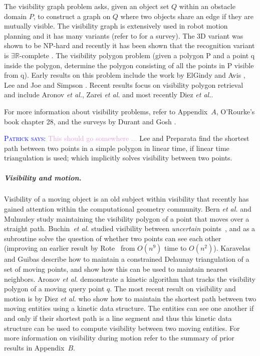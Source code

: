 \documentclass[a4paper, UKenglish]{lipics-v2018}
\newcommand{\myremark}[4]{\textcolor{blue}{\textsc{#1 #2:}} \textcolor{#4}{\textsf{#3}}}
\newcommand{\patrick}[2][says]{\myremark{Patrick}{#1}{#2}{Plum}}
\newcommand{\etal}{\textit{et al.}\xspace}
\begin{document}
The visibility graph problem asks, given an object set $Q$ within an obstacle domain $P$, to construct a graph on $Q$ where two objects share an edge if they are mutually visible. The visibility graph is extensively used in robot motion planning \cite{de1997computational} and it has many variants (refer to \cite{Ghosh:2013:UPV:2543581.2543589} for a survey). The 3D variant was shown to be NP-hard \cite{canny1988complexity} and recently it has been shown that the recognition variant is $\exists \mathbb{R}$-complete \cite{cardinal2017recognition}. The visibility polygon problem (given a polygon P and a point q inside the polygon, determine the polygon consisting of all the points in P visible from q). Early results on this problem include the work by ElGindy and Avis \cite{el1981linear}, Lee \cite{lee1983visibility} and Joe and Simpson \cite{joe1987corrections}. Recent results focus on visibility polygon retrieval and include Aronov \etal \cite{aronov2002visibility}, Zarei \etal \cite{zarei2005efficient} and most recently Diez \etal \cite{DKRRS2017KineticAPSPEuroCG}.

For more information about visibility problems, refer to Appendix~$A$, O'Rourke's book \cite{ORourke87} chapter 28, and the surveys by Durant \cite{durand2000multidisciplinary} and Gosh  \cite{Ghosh:2013:UPV:2543581.2543589}. 

\patrick{This should go somewhere ...} Lee and Preparata \cite{LeeP84} find the shortest path between two points in a simple polygon in linear time, if linear time triangulation is used; which implicitly solves visibility between two points.

\subparagraph{Visibility and motion.}

Visibility of a moving object is an old subject within visibility that recently has gained attention within the computational geometry community. Bern \etal \cite{bern1994visibility} and  Mulmuley \cite{mulmuley1991hidden} study maintaining the visibility polygon of a point that moves over a straight path. 
Buchin~\etal studied visibility between {\em uncertain} points~\cite {bkls-rbavil-19}, and as a subroutine solve the question of whether two points can see each other (improving an earlier result by Rote~\cite{r-dc-13} from
$O(n^9)$ time to $O(n^2)$).  Karavelas and Guibas \cite{karavelas2001static} describe how to maintain a constrained Delaunay triangulation of a set of moving points, and show how this can be used to maintain nearest neighbors.
Aronov \etal \cite{aronov2002visibility} demonstrate a kinetic algorithm that tracks the visibility polygon of a moving query point $q$. The most recent result on visibility and motion is by Diez \etal \cite{DKRRS2017KineticAPSPEuroCG} who show how to maintain the shortest path between two moving entities using a kinetic data structure. The entities can see one another if and only if their shortest path is a line segment and thus this kinetic data structure can be used to compute visibility between two moving entities. For more information on visibility during motion refer to the summary of prior results in Appendix~$B$.
\end{document}
